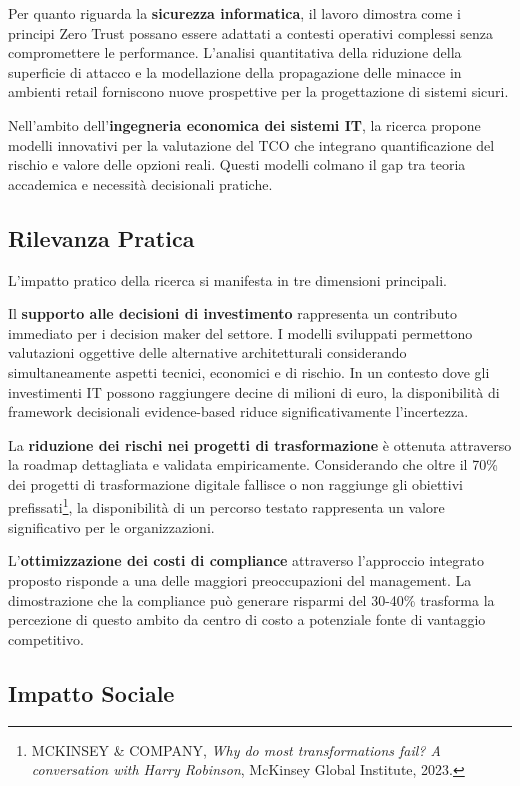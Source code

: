 \begin{bibunit}[IEEEtran]
Per quanto riguarda la \textbf{sicurezza informatica}, il lavoro dimostra come i principi Zero Trust possano essere adattati a contesti operativi complessi senza compromettere le performance. L'analisi quantitativa della riduzione della superficie di attacco e la modellazione della propagazione delle minacce in ambienti retail forniscono nuove prospettive per la progettazione di sistemi sicuri.

Nell'ambito dell'\textbf{ingegneria economica dei sistemi IT}, la ricerca propone modelli innovativi per la valutazione del TCO che integrano quantificazione del rischio e valore delle opzioni reali. Questi modelli colmano il gap tra teoria accademica e necessità decisionali pratiche.

\subsection{Rilevanza Pratica}

L'impatto pratico della ricerca si manifesta in tre dimensioni principali.

Il \textbf{supporto alle decisioni di investimento} rappresenta un contributo immediato per i decision maker del settore. I modelli sviluppati permettono valutazioni oggettive delle alternative architetturali considerando simultaneamente aspetti tecnici, economici e di rischio. In un contesto dove gli investimenti IT possono raggiungere decine di milioni di euro, la disponibilità di framework decisionali evidence-based riduce significativamente l'incertezza.

La \textbf{riduzione dei rischi nei progetti di trasformazione} è ottenuta attraverso la roadmap dettagliata e validata empiricamente. Considerando che oltre il 70\% dei progetti di trasformazione digitale fallisce o non raggiunge gli obiettivi prefissati\footnote{MCKINSEY \& COMPANY, \textit{Why do most transformations fail? A conversation with Harry Robinson}, McKinsey Global Institute, 2023.}, la disponibilità di un percorso testato rappresenta un valore significativo per le organizzazioni.

L'\textbf{ottimizzazione dei costi di compliance} attraverso l'approccio integrato proposto risponde a una delle maggiori preoccupazioni del management. La dimostrazione che la compliance può generare risparmi del 30-40\% trasforma la percezione di questo ambito da centro di costo a potenziale fonte di vantaggio competitivo.

\subsection{Impatto Sociale}


\end{bibunit}
